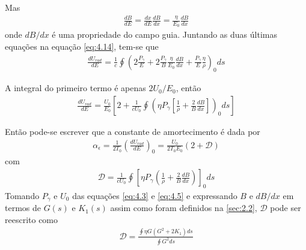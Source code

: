 Mas
\begin{align*}
	\frac{dB}{dE} = \frac{dx}{dE}\frac{dB}{dx} = \frac{\eta}{E_0}\frac{dB}{dx}
\end{align*}
onde $dB/dx$ é uma propriedade do campo guia. Juntando as duas últimas equações na equação \eqref{eq:4.14}, tem-se que
\begin{align*}
	\frac{dU_{rad}}{dE} = \frac{1}{c}\oint \left(2\frac{P_\gamma}{E} + 2\frac{P_\gamma}{B}\frac{\eta}{E_0}\frac{dB}{dx} + \frac{P_\gamma}{E}\frac{\eta}{\rho}\right)_0 ds
\end{align*}

A integral do primeiro termo é apenas $2U_0/E_0$, então
\begin{align}
	\frac{dU_{rad}}{dE} = \frac{U_0}{E_0}\left[2+\frac{1}{cU_0}\oint \left(\eta P_\gamma \left[\frac{1}{\rho} + \frac{2}{B}\frac{dB}{dx}\right]\right)_0 ds\right]
\end{align}

Então pode-se escrever que a constante de amortecimento é dada por
\begin{align}
	\alpha_\epsilon = \frac{1}{2T_0}\left(\frac{dU_{rad}}{dE}\right)_0 = \frac{U_0}{2T_0E_0}(2+\mathscr{D})\label{eq:4.16}
\end{align}
com
\begin{align}
	\mathscr{D} = \frac{1}{cU_0}\oint \left[\eta P_\gamma\left(\frac{1}{\rho}+\frac{2}{B}\frac{dB}{dx}\right)\right]_0 ds\label{eq:4.17}
\end{align}
Tomando $P_\gamma$ e $U_0$ das equações \eqref{eq:4.3} e \eqref{eq:4.5} e expressando $B$ e $dB/dx$ em termos de $G(s)$ e $K_1(s)$ assim como foram definidos na \autoref{sec:2.2}, $\mathscr{D}$ pode ser reescrito como
\begin{align}
	\mathscr{D} = \frac{\oint \eta G \left(G^2 + 2K_1\right)ds}{\oint G^2 ds}\label{eq:4.18}
\end{align}

